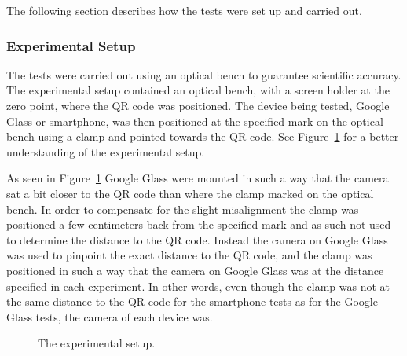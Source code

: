 The following section describes how the tests were set up and carried out.

\subsubsection{Experimental Setup}
The tests were carried out using an optical bench to guarantee scientific accuracy. The experimental setup contained an optical bench, with a screen holder at the zero point, where the QR code was positioned. The device being tested, Google Glass or smartphone, was then positioned at the specified mark on the optical bench using a clamp and pointed towards the QR code. See Figure~\ref{experimentalSetup} for a better understanding of the experimental setup. 

As seen in Figure~\ref{experimentalSetup} Google Glass were mounted in such a way that the camera sat a bit closer to the QR code than where the clamp marked on the optical bench. In order to compensate for the slight misalignment the clamp was positioned a few centimeters back from the specified mark and as such not used to determine the distance to the QR code. Instead the camera on Google Glass was used to pinpoint the exact distance to the QR code, and the clamp was positioned in such a way that the camera on Google Glass was at the distance specified in each experiment. In other words, even though the clamp was not at the same distance to the QR code for the smartphone tests as for the Google Glass tests, the camera of each device was.

	\begin{figure}[H]%
		\centering
   		 \qquad
   		 \qquad
		\caption{The experimental setup.}
		\label{experimentalSetup}
	\end{figure}

